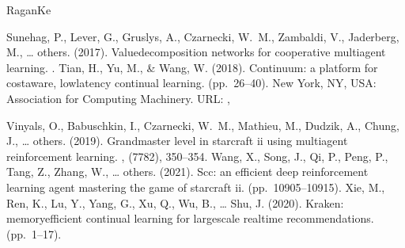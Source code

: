 \documentclass[letterpaper,10pt,english]{sphinxmanual}
\begin{document}
\begin{sphinxthebibliography}{Ragan\sphinxhyphen{}Ke}
\begin{footnote}[82]\sphinxAtStartFootnote
{}
%
\end{footnote}
\sphinxAtStartPar
Sunehag, P., Lever, G., Gruslys, A., Czarnecki, W. M., Zambaldi, V., Jaderberg, M., … others. (2017). Value\sphinxhyphen{}decomposition networks for cooperative multi\sphinxhyphen{}agent learning. .
\sphinxAtStartPar
Tian, H., Yu, M., \& Wang, W. (2018). Continuum: a platform for cost\sphinxhyphen{}aware, low\sphinxhyphen{}latency continual learning.  (pp. 26–40). New York, NY, USA: Association for Computing Machinery. URL: , %
\begin{footnote}[83]\sphinxAtStartFootnote
{}
%
\end{footnote}
\sphinxAtStartPar
Vinyals, O., Babuschkin, I., Czarnecki, W. M., Mathieu, M., Dudzik, A., Chung, J., … others. (2019). Grandmaster level in starcraft ii using multi\sphinxhyphen{}agent reinforcement learning. , (7782), 350–354.
\sphinxAtStartPar
Wang, X., Song, J., Qi, P., Peng, P., Tang, Z., Zhang, W., … others. (2021). Scc: an efficient deep reinforcement learning agent mastering the game of starcraft ii.  (pp. 10905–10915).
\sphinxAtStartPar
Xie, M., Ren, K., Lu, Y., Yang, G., Xu, Q., Wu, B., … Shu, J. (2020). Kraken: memory\sphinxhyphen{}efficient continual learning for large\sphinxhyphen{}scale real\sphinxhyphen{}time recommendations.  (pp. 1–17). %
\begin{footnote}[84]\sphinxAtStartFootnote
{}

\end{footnote}
\end{sphinxthebibliography}
\end{document}
